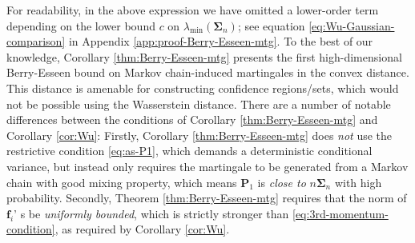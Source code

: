 For readability, in the above expression we have omitted a lower-order term depending on the lower bound $c$ on $\lambda_{\min}(\bm{\Sigma}_n)$; see equation \eqref{eq:Wu-Gaussian-comparison} in Appendix \ref{app:proof-Berry-Esseen-mtg}.
To the best of our knowledge, Corollary \ref{thm:Berry-Esseen-mtg} presents the first high-dimensional Berry-Esseen bound on Markov chain-induced martingales in the convex distance. This distance is amenable for constructing confidence regions/sets, which would not be possible using the Wasserstein distance.
There are a number of notable differences between the conditions of Corollary \ref{thm:Berry-Esseen-mtg} and Corollary \ref{cor:Wu}: Firstly, Corollary \ref{thm:Berry-Esseen-mtg} does \emph{not} use the restrictive condition \eqref{eq:as-P1}, which demands a deterministic conditional variance, but instead only requires the martingale to be generated from a Markov chain with good mixing property, 
which means $\bm{P}_1$ is \emph{close to} $n \bm{\Sigma}_n$ with high probability. Secondly, Theorem \ref{thm:Berry-Esseen-mtg} requires that the norm of $\bm{f}_i$' s be \emph{uniformly bounded}, which is strictly stronger than \eqref{eq:3rd-momentum-condition}, as required by Corollary \ref{cor:Wu}. 

